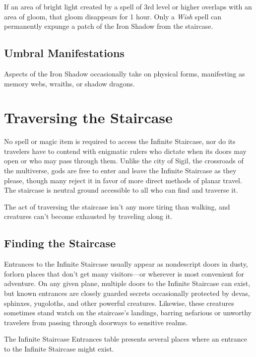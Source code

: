 \documentclass[10pt,a4paper,twoside,bg=print,twocolumn,openany,nodeprecatedcode]{dndbook}
\begin{document}
If an area of bright light created by a spell of 3rd level or higher overlaps with an area of gloom, that gloom disappears for 1 hour. Only a \textit{Wish} spell can permanently expunge a patch of the Iron Shadow from the staircase.

\subsection{Umbral Manifestations}
Aspects of the Iron Shadow occasionally take on physical forms, manifesting as memory webs, wraiths, or shadow dragons.

\section{Traversing the Staircase}
No spell or magic item is required to access the Infinite Staircase, nor do its travelers have to contend with enigmatic rulers who dictate when its doors may open or who may pass through them. Unlike the city of Sigil, the crossroads of the multiverse, gods are free to enter and leave the Infinite Staircase as they please, though many reject it in favor of more direct methods of planar travel. The staircase is neutral ground accessible to all who can find and traverse it.

The act of traversing the staircase isn't any more tiring than walking, and creatures can't become exhausted by traveling along it.

\subsection{Finding the Staircase}
Entrances to the Infinite Staircase usually appear as nondescript doors in dusty, forlorn places that don't get many visitors—or wherever is most convenient for adventure. On any given plane, multiple doors to the Infinite Staircase can exist, but known entrances are closely guarded secrets occasionally protected by devas, sphinxes, yugoloths, and other powerful creatures. Likewise, these creatures sometimes stand watch on the staircase's landings, barring nefarious or unworthy travelers from passing through doorways to sensitive realms.

The Infinite Staircase Entrances table presents several places where an entrance to the Infinite Staircase might exist.
\end{document}
